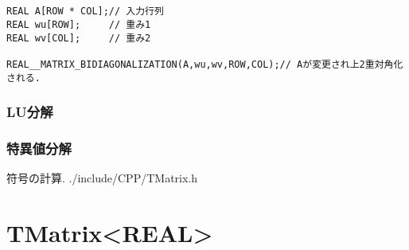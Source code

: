 \documentclass[a4j]{jsarticle}
\begin{document}
\begin{lstlisting}[caption=上2重対角化,label=ほげ]


REAL A[ROW * COL];// 入力行列
REAL wu[ROW];     // 重み1
REAL wv[COL];     // 重み2

REAL__MATRIX_BIDIAGONALIZATION(A,wu,wv,ROW,COL);// Aが変更され上2重対角化される. 

\end{lstlisting}


\subsubsection{LU分解}
\subsubsection{特異値分解}
符号の計算. 
./include/CPP/TMatrix.h




\section{TMatrix<REAL>}




\end{document}
